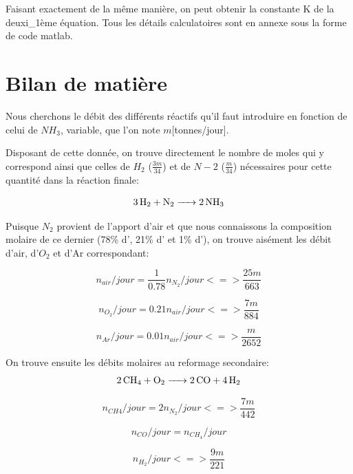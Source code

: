 \documentclass[a4paper, oneside, 12pt]{article}
\begin{document}
Faisant exactement de la même manière, on peut obtenir la constante K de la deuxi_{1}ème équation. Tous 
les détails calculatoires sont en annexe sous la forme de code matlab.

\section{Bilan de matière}

Nous cherchons le débit des différents réactifs qu'il faut introduire en fonction de celui de $NH_3$, 
variable, que l'on note $m$[tonnes/jour].

Disposant de cette donnée, on trouve directement le nombre de moles qui y correspond ainsi que 
celles de $H_2$ ($\frac{3m}{34}$) et de $N-2$ ($\frac{m}{34}$) nécessaires  pour cette quantité dans la réaction finale:

\begin{equation*}
	\ce{3H2 + N2 -> 2NH3}
\end{equation*}

Puisque $N_2$ provient de l'apport d'air et que nous connaissons la composition molaire 
de ce dernier (78\% d', 21\% d' et 1\% d'), 
on trouve aisément les débit d'air, d'$O_2$ et d'Ar correspondant:

\begin{equation}
	n_{air}/jour=\frac{1}{0.78} n_{N_2}/jour <=> \frac{25 m}{663}
\end{equation}

\begin{equation}
	n_{O_2}/jour=0.21 n_{air}/jour <=> \frac{7 m}{884}
\end{equation}

\begin{equation}
	n_{Ar}/jour=0.01 n_{air}/jour <=> \frac{m}{2652}
\end{equation}

On trouve ensuite les débits molaires au reformage secondaire:
\begin{equation*}
	\ce{2CH4 + O2 -> 2CO + 4H2}
\end{equation*}

\begin{equation}
	n_{CH4}/jour=2 n_{N_2}/jour <=> \frac{7 m}{442}
\end{equation}

\begin{equation}
	n_{CO}/jour=n_{CH_4}/jour
\end{equation}

\begin{equation}
	n_{H_2}/jour <=> \frac{9m}{221}
\end{equation}
\end{document}
